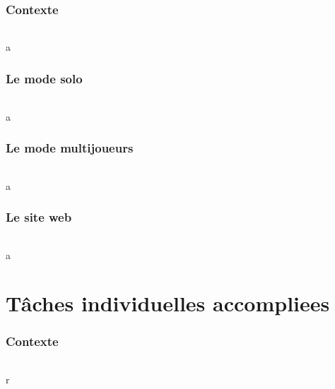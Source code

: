 \documentclass[titlepage, 13px, a4paper]{report}
\begin{document}
\section{Contexte}
\paragraph{} \hspace{0pt}
a

\newpage
\section{Le mode solo}
\paragraph{} \hspace{0pt}
a

\newpage
\section{Le mode multijoueurs}
\paragraph{} \hspace{0pt}
a

\section{Le site web}
\paragraph{} \hspace{0pt}
a


\newpage


\part{Tâches individuelles accompliees}
\section{Contexte}
\paragraph{} \hspace{0pt}
r
\end{document}
